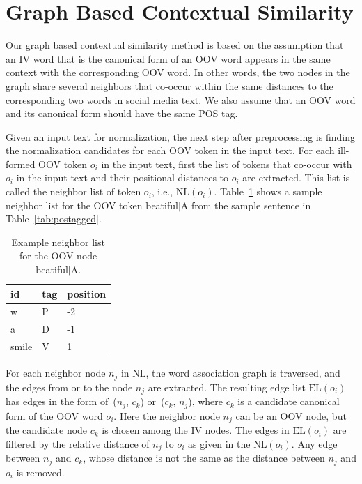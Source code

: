 \documentclass[a4paper,onesided,12pt]{report}
\begin{document}
\section{Graph Based Contextual Similarity}
\label{sec:consim}

Our graph based contextual similarity method is based on the assumption that an IV word that is the canonical form of an OOV word appears in the same context with the corresponding OOV word. In other words, the two nodes in the graph share several neighbors that co-occur within the same distances to the corresponding two words in social media text. We also assume that an OOV word and its canonical form should have the same POS tag.

Given an input text for normalization, the next step after preprocessing is finding the normalization candidates for each OOV token in the input text. For each ill-formed OOV token $o_i$ in the input text, first the list of tokens that co-occur with $o_i$ in the input text and their positional distances to $o_i$ are extracted.  This list is called the neighbor list of token $o_i$, i.e.,  $\text{NL}(o_i)$. Table~\ref{tab:neigh} shows a sample neighbor list for the OOV token beatiful$|$A from the sample sentence in Table~\ref{tab:postagged}.

\begin{table}[hbt]
\caption{Example neighbor list for the OOV node beatiful$|$A.}
\centering
\begin{tabular}{|l|l|l|}
    \hline
    \textbf{id} & \textbf{tag} & \textbf{position} \\
    \hline
    w & P & -2 \\     \hline
    a & D & -1 \\     \hline
    smile & V & 1 \\     \hline
  \end{tabular}
\label{tab:neigh}
\end{table}

For each neighbor node $n_{j}$ in $\text{NL}$, the word association graph is traversed, and the edges from or to the node $n_{j}$ are extracted. The resulting edge list $\text{EL}(o_i)$ has edges in the form of~($n_{j}$, $c_{k}$) or~($c_{k}$, $n_{j}$), where $c_{k}$ is a candidate canonical form of the OOV word $o_i$.
Here the neighbor node $n_{j}$ can be an OOV node, but the candidate node $c_{k}$ is chosen among the IV nodes.
The edges in $\text{EL}(o_i)$ are filtered by the relative distance of $n_{j}$ to $o_i$ as given in the $\text{NL}(o_i)$. Any edge between  $n_{j}$ and $c_{k}$, whose distance is not the same as the distance between $n_{j}$ and $o_i$ is removed.
\end{document}
